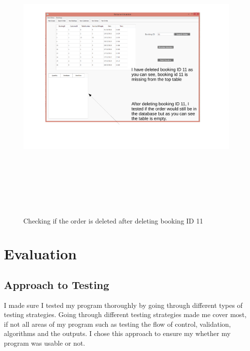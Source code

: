 \begin{landscape}
\begin{figure}[H]
    \includegraphics[height = 15cm]{./Testing/images/booking11delete.pdf}
    \caption{Checking if the order is deleted after deleting booking ID 11} \label{fig:searchDeletedBooking}
\end{figure}

\end{landscape}

\section{Evaluation}

\subsection{Approach to Testing}

I made sure I tested my program thoroughly by going through different types of testing strategies. Going through different testing strategies made me cover most, if not all areas of my program such as testing the flow of control, validation, algorithms and the outputs.  I chose this approach to ensure my whether my program was usable or not.

